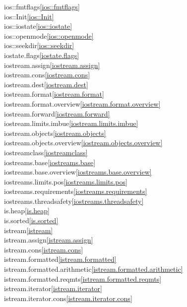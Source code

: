 \begin{multicols}{2}
ios::fmtflags\quad\ref{ios::fmtflags}\\
ios::Init\quad\ref{ios::Init}\\
ios::iostate\quad\ref{ios::iostate}\\
ios::openmode\quad\ref{ios::openmode}\\
ios::seekdir\quad\ref{ios::seekdir}\\
iostate.flags\quad\ref{iostate.flags}\\
iostream.assign\quad\ref{iostream.assign}\\
iostream.cons\quad\ref{iostream.cons}\\
iostream.dest\quad\ref{iostream.dest}\\
iostream.format\quad\ref{iostream.format}\\
iostream.format.overview\quad\ref{iostream.format.overview}\\
iostream.forward\quad\ref{iostream.forward}\\
iostream.limits.imbue\quad\ref{iostream.limits.imbue}\\
iostream.objects\quad\ref{iostream.objects}\\
iostream.objects.overview\quad\ref{iostream.objects.overview}\\
iostreamclass\quad\ref{iostreamclass}\\
iostreams.base\quad\ref{iostreams.base}\\
iostreams.base.overview\quad\ref{iostreams.base.overview}\\
iostreams.limits.pos\quad\ref{iostreams.limits.pos}\\
iostreams.requirements\quad\ref{iostreams.requirements}\\
iostreams.threadsafety\quad\ref{iostreams.threadsafety}\\
is.heap\quad\ref{is.heap}\\
is.sorted\quad\ref{is.sorted}\\
istream\quad\ref{istream}\\
istream.assign\quad\ref{istream.assign}\\
istream.cons\quad\ref{istream.cons}\\
istream.formatted\quad\ref{istream.formatted}\\
istream.formatted.arithmetic\quad\ref{istream.formatted.arithmetic}\\
istream.formatted.reqmts\quad\ref{istream.formatted.reqmts}\\
istream.iterator\quad\ref{istream.iterator}\\
istream.iterator.cons\quad\ref{istream.iterator.cons}\\

\end{multicols}
